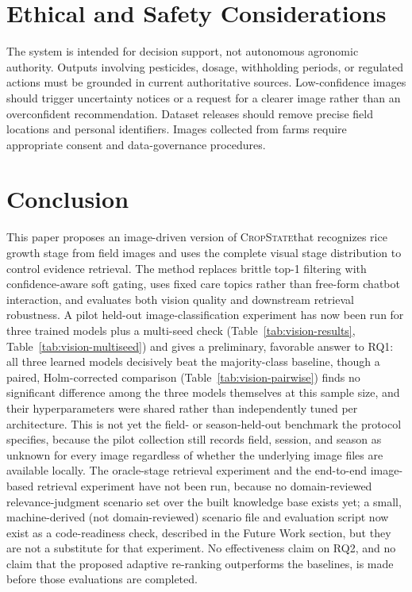\documentclass[conference]{IEEEtran}
\newcommand{\method}{\textsc{CropState}}
\begin{document}
\section{Ethical and Safety Considerations}
The system is intended for decision support, not autonomous agronomic authority. Outputs involving pesticides, dosage, withholding periods, or regulated actions must be grounded in current authoritative sources. Low-confidence images should trigger uncertainty notices or a request for a clearer image rather than an overconfident recommendation. Dataset releases should remove precise field locations and personal identifiers. Images collected from farms require appropriate consent and data-governance procedures.

\section{Conclusion}
This paper proposes an image-driven version of \method that recognizes rice growth stage from field images and uses the complete visual stage distribution to control evidence retrieval. The method replaces brittle top-1 filtering with confidence-aware soft gating, uses fixed care topics rather than free-form chatbot interaction, and evaluates both vision quality and downstream retrieval robustness. A pilot held-out image-classification experiment has now been run for three trained models plus a multi-seed check (Table~\ref{tab:vision-results}, Table~\ref{tab:vision-multiseed}) and gives a preliminary, favorable answer to RQ1: all three learned models decisively beat the majority-class baseline, though a paired, Holm-corrected comparison (Table~\ref{tab:vision-pairwise}) finds no significant difference among the three models themselves at this sample size, and their hyperparameters were shared rather than independently tuned per architecture. This is not yet the field- or season-held-out benchmark the protocol specifies, because the pilot collection still records field, session, and season as unknown for every image regardless of whether the underlying image files are available locally. The oracle-stage retrieval experiment and the end-to-end image-based retrieval experiment have not been run, because no domain-reviewed relevance-judgment scenario set over the built knowledge base exists yet; a small, machine-derived (not domain-reviewed) scenario file and evaluation script now exist as a code-readiness check, described in the Future Work section, but they are not a substitute for that experiment. No effectiveness claim on RQ2, and no claim that the proposed adaptive re-ranking outperforms the baselines, is made before those evaluations are completed.
\end{document}
